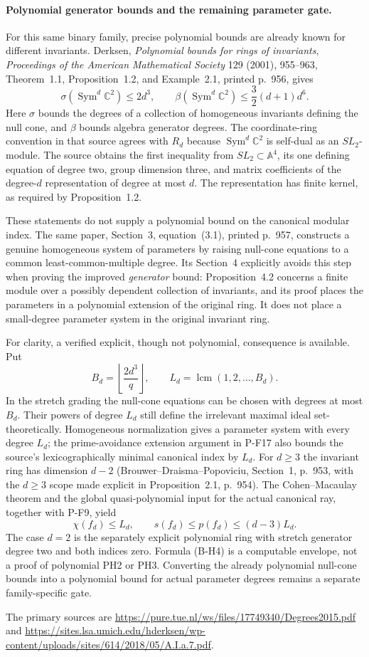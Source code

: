 \paragraph{Polynomial generator bounds and the remaining parameter gate.}
For this same binary family, precise polynomial bounds are already
known for different invariants. Derksen,
\emph{Polynomial bounds for rings of invariants},
\emph{Proceedings of the American Mathematical Society} 129 (2001),
955--963, Theorem~1.1, Proposition~1.2, and Example~2.1,
printed p.~956, gives
\[
 \sigma(\operatorname{Sym}^d\mathbb C^2)\le2d^3,
 \qquad
 \beta(\operatorname{Sym}^d\mathbb C^2)
       \le\frac32(d+1)d^6.
 \tag{B-H3}
\]
Here $\sigma$ bounds the degrees of a collection of homogeneous
invariants defining the null cone, and $\beta$ bounds algebra
generator degrees. The coordinate-ring convention in that source
agrees with $R_d$ because $\operatorname{Sym}^d\mathbb C^2$ is
self-dual as an $SL_2$-module. The source obtains the first inequality from
$SL_2\subset\mathbb A^4$, its one defining equation of degree two,
group dimension three, and matrix coefficients of the degree-$d$
representation of degree at most $d$. The representation has
finite kernel, as required by Proposition~1.2.

These statements do not supply a polynomial bound on the canonical
modular index. The same paper, Section~3, equation~(3.1), printed
p.~957, constructs a genuine homogeneous system of parameters by
raising null-cone equations to a common least-common-multiple
degree. Its Section~4 explicitly avoids this step when proving
the improved \emph{generator} bound: Proposition~4.2 concerns a
finite module over a possibly dependent collection of invariants,
and its proof places the parameters in a polynomial extension of
the original ring. It does not place a small-degree parameter
system in the original invariant ring.

For clarity, a verified explicit, though not polynomial, consequence
is available. Put
\[
 B_d=\left\lfloor\frac{2d^3}{q}\right\rfloor,
 \qquad L_d=\operatorname{lcm}(1,2,\ldots,B_d).
\]
In the stretch grading the null-cone equations can be chosen with
degrees at most $B_d$. Their powers of degree $L_d$ still define
the irrelevant maximal ideal set-theoretically. Homogeneous
normalization gives a parameter system with every degree $L_d$;
the prime-avoidance extension argument in P-F17 also bounds the
source's lexicographically minimal canonical index by $L_d$.
For $d\ge3$ the invariant ring has dimension $d-2$
(Brouwer--Draisma--Popoviciu, Section~1, p.~953, with the
$d\ge3$ scope made explicit in Proposition~2.1, p.~954).
The Cohen--Macaulay theorem and the global quasi-polynomial
input for the actual canonical ray, together with P-F9, yield
\[
 \chi(f_d)\le L_d,\qquad
 s(f_d)\le p(f_d)\le(d-3)L_d.
 \tag{B-H4}
\]
The case $d=2$ is the separately explicit polynomial ring with
stretch generator degree two and both indices zero. Formula
(B-H4) is a computable envelope, not a proof of polynomial PH2 or
PH3. Converting the already polynomial null-cone bounds into a
polynomial bound for actual parameter degrees remains a separate
family-specific gate.

The primary sources are
\url{https://pure.tue.nl/ws/files/17749340/Degrees2015.pdf}
and
\url{https://sites.lsa.umich.edu/hderksen/wp-content/uploads/sites/614/2018/05/A.I.a.7.pdf}.
